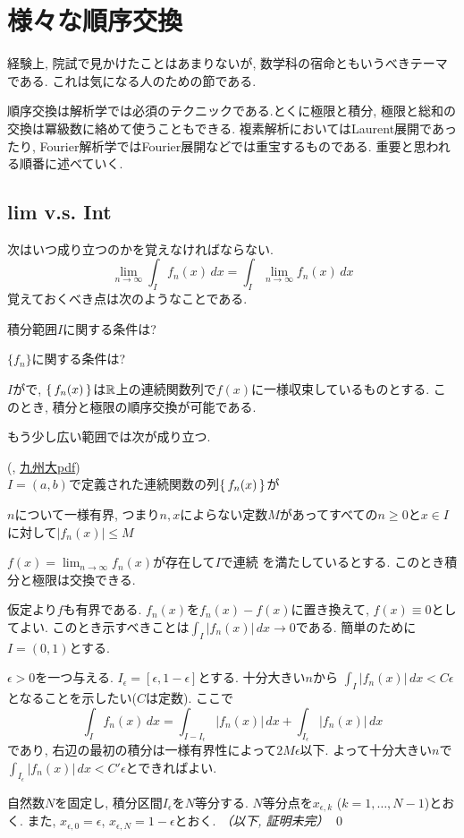 \section{様々な順序交換}
経験上, 院試で見かけたことはあまりないが, 数学科の宿命ともいうべきテーマである. これは気になる人のための節である.\par
順序交換は解析学では必須のテクニックである.とくに極限と積分, 極限と総和の交換は冪級数に絡めて使うこともできる.  複素解析においてはLaurent展開であったり, Fourier解析学ではFourier展開などでは重宝するものである.
重要と思われる順番に述べていく.


\subsection{lim v.s. Int}
次はいつ成り立つのかを覚えなければならない.
\[\lim_{n\to \infty} \int_{I} f_n(x)\, dx = \int_{I}\lim_{n\to \infty} f_n(x)\, dx\]
覚えておくべき点は次のようなことである.
\ben
\item 積分範囲$I$に関する条件は?
\item $\{ f_n \}$に関する条件は?
\een

\begin{theo}
$I$がで, $\set{f_n(x)}$は$\mathbb{R}$上の連続関数列で$f(x)$に一様収束しているものとする. このとき, 積分と極限の順序交換が可能である.
\end{theo}

もう少し広い範囲では次が成り立つ.
\begin{theo} (, \href{https://www2.math.kyushu-u.ac.jp/~hara/lectures/05/biseki4b-051214.pdf}{九州大pdf}) \\
$I=(a,b)$で定義された連続関数の列$\set{f_n(x)}$が
\ben
\item $n$について一様有界, つまり$n,x$によらない定数$M$があってすべての$n\geq 0$と$x\in I$に対して$|f_n(x)|\leq M$
\item $f(x) = \lim_{n\to \infty} f_n(x)$が存在して$I$で連続
\een
を満たしているとする. このとき積分と極限は交換できる.
\end{theo}
\prf 仮定より$f$も有界である.
$f_n(x)$を$f_n(x) - f(x)$に置き換えて, $f(x)\equiv 0$としてよい. このとき示すべきことは$\int_{I}|f_n(x)|\, dx \to 0$である. 簡単のために$I=(0,1)$とする. \par
$\epsilon > 0$を一つ与える. $I_{\epsilon} = [\epsilon,1-\epsilon]$とする. 十分大きい$n$から $\int_{I}|f_n(x)|\, dx < C\epsilon$となることを示したい($C$は定数). ここで
\[\int_{I}f_n(x)\, dx = \int_{I-I_{\epsilon}}|f_n(x)|\, dx + \int_{I_{\epsilon}}|f_n(x)|\, dx\]
であり, 右辺の最初の積分は一様有界性によって$2M\epsilon$以下. よって十分大きい$n$で$\int_{I_{\epsilon}}|f_n(x)|\, dx<C'\epsilon$とできればよい. \par
自然数$N$を固定し, 積分区間$I_{\epsilon}$を$N$等分する. $N$等分点を$x_{\epsilon,k}$ ($k=1,\dots, N-1$)とおく. また, $x_{\epsilon,0} = \epsilon$, $x_{\epsilon,N} = 1-\epsilon$とおく. \textit{（以下, 証明未完）}
\qed


